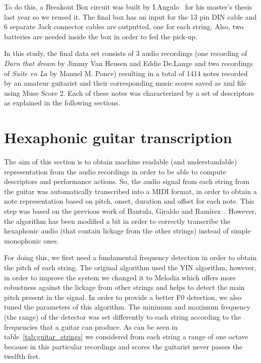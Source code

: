 To do this, a Breakout Box circuit was built by I.Angulo~\cite{Angulo2016} for his master's thesis last year so we reused it. The final box has an input for the 13 pin DIN cable and 6 separate Jack connector cables are outputted, one for each string. Also, two batteries are needed inside the box in order to fed the pick-up. 

In this study, the final data set consists of 3 audio recordings (one recording of \textit{Darn that dream} by Jimmy Van Heusen and Eddie De.Lange and two recordings of \textit{Suite en La} by Manuel M. Ponce) resulting in a total of 1414 notes recorded by an amateur guitarist and their corresponding music scores saved as xml file using Muse Score 2. Each of these notes was characterized by a set of descriptors as explained in the following sections.  

\section{Hexaphonic guitar transcription}
The aim of this section is to obtain machine readable (and understandable) representation from the audio recordings in order to be able to compute descriptors and performance actions. So, the audio signal from each string from the guitar was automatically transcribed into a MIDI format, in order to obtain a note representation based on pitch, onset, duration and offset for each note. This step was based on the previous work of Bantula, Giraldo and Ramírez~\cite{bantula2016}. However, the algorithm has been modified a bit in order to correctly transcribe the hexaphonic audio (that contain lickage from the other strings) instead of simple monophonic ones.

For doing this, we first need a fundamental frequency detection in order to obtain the pitch of each string. The original algorithm used the YIN algorithm, however, in order to improve the system we changed it to Melodia which offers more robustness against the lickage from other strings and helps to detect the main pitch present in the signal. In order to provide a better F0 detection, we also tuned the parameters of this algorithm. The minimum and maximum frequency (the range) of the detector was set differently to each string according to the frequencies that a guitar can produce. As can be seen in table~\ref{tab:guitar_strings} we considered from each string a range of one octave because in this particular recordings and scores the guitarist never passes the twelfth fret.



